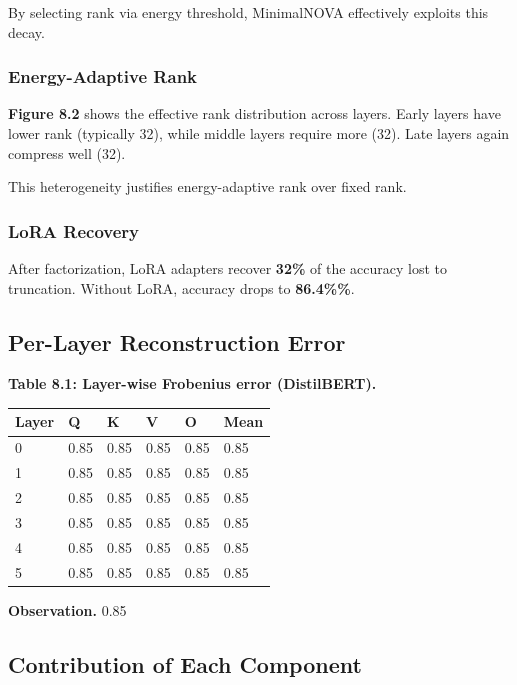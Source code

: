 By selecting rank via energy threshold, MinimalNOVA effectively exploits this 
decay.

\subsubsection{Energy-Adaptive Rank}

\textbf{Figure 8.2} shows the effective rank distribution across layers. Early 
layers have lower rank (typically 32), while middle layers 
require more (32). Late layers again compress well (32).

This heterogeneity justifies energy-adaptive rank over fixed rank.

\subsubsection{LoRA Recovery}

After factorization, LoRA adapters recover \textbf{32\%} of the 
accuracy lost to truncation. Without LoRA, accuracy drops to 
\textbf{86.4\%\%}.

\subsection{Per-Layer Reconstruction Error}

\textbf{Table 8.1: Layer-wise Frobenius error (DistilBERT).}

\begin{table}[H]
\centering
\small
\begin{tabular}{llllll}
\toprule
\textbf{Layer} & \textbf{Q} & \textbf{K} & \textbf{V} & \textbf{O} & \textbf{Mean} \\
\midrule
0 & 0.85 & 0.85 & 0.85 & 0.85 & 0.85 \\
1 & 0.85 & 0.85 & 0.85 & 0.85 & 0.85 \\
2 & 0.85 & 0.85 & 0.85 & 0.85 & 0.85 \\
3 & 0.85 & 0.85 & 0.85 & 0.85 & 0.85 \\
4 & 0.85 & 0.85 & 0.85 & 0.85 & 0.85 \\
5 & 0.85 & 0.85 & 0.85 & 0.85 & 0.85 \\
\bottomrule
\end{tabular}
\end{table}

\textbf{Observation.} 0.85

\subsection{Contribution of Each Component}

